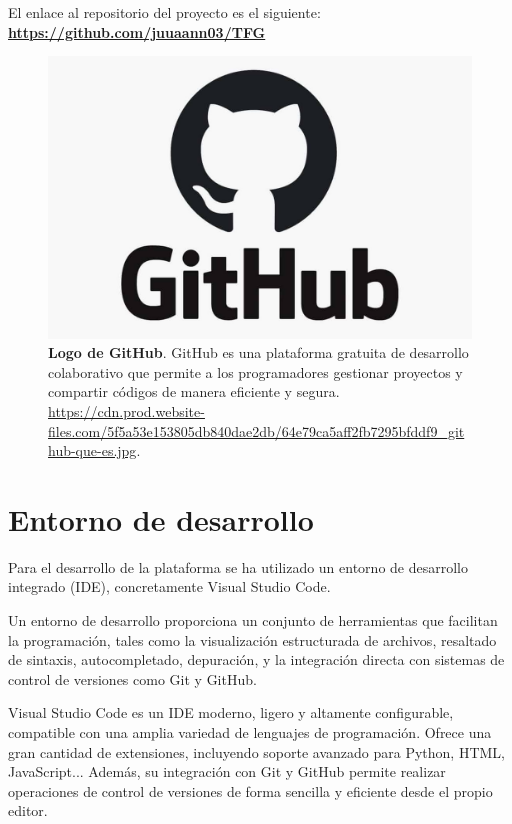 El enlace al repositorio del proyecto es el siguiente: \textbf{\url{https://github.com/juuaann03/TFG}}


\begin{figure}[H]
     \centering
     \includegraphics[width=1\linewidth]{imagenes/gitHubLogo.jpg}
     \caption[\textbf{Logo de GitHub}.]{\textbf{Logo de GitHub}. GitHub es una plataforma gratuita de desarrollo colaborativo que permite a los programadores gestionar proyectos y compartir códigos de manera eficiente y segura. \href{https://cdn.prod.website-files.com/5f5a53e153805db840dae2db/64e79ca5aff2fb7295bfddf9_github-que-es.jpg}{https://cdn.prod.website-files.com/5f5a53e153805db840dae2db/64e79ca5aff2fb7295bfddf9\_github-que-es.jpg}.}
     \label{logo-github}
 \end{figure}


\newpage


\section{Entorno de desarrollo}

Para el desarrollo de la plataforma se ha utilizado un entorno de desarrollo integrado (IDE), concretamente Visual Studio Code.

Un entorno de desarrollo proporciona un conjunto de herramientas que facilitan la programación, tales como la visualización estructurada de archivos, resaltado de sintaxis, autocompletado, depuración, y la integración directa con sistemas de control de versiones como Git y GitHub.

Visual Studio Code es un IDE moderno, ligero y altamente configurable, compatible con una amplia variedad de lenguajes de programación. Ofrece una gran cantidad de extensiones, incluyendo soporte avanzado para Python, HTML, JavaScript... Además, su integración con Git y GitHub permite realizar operaciones de control de versiones de forma sencilla y eficiente desde el propio editor.

